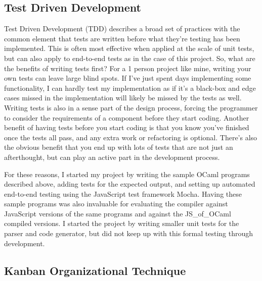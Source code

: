 \documentclass[12pt,a4paper,twoside,openright]{report}
\begin{document}
\subsection{Test Driven Development}
Test Driven Development (TDD) describes a broad set of practices with the common element that tests are written before what they're testing has been implemented.
This is often most effective when applied at the scale of unit tests, but can also apply to end-to-end tests as in the case of this project.
So, what are the benefits of writing tests first?
For a 1 person project like mine, writing your own tests can leave large blind spots.
If I've just spent days implementing some functionality, I can hardly test my implementation as if it's a black-box and edge cases missed in the implementation will likely be missed by the tests as well.
Writing tests is also in a sense part of the design process, forcing the programmer to consider the requirements of a component before they start coding.
Another benefit of having tests before you start coding is that you know you've finished once the tests all pass, and any extra work or refactoring is optional.
There's also the obvious benefit that you end up with lots of tests that are not just an afterthought, but can play an active part in the development process.

For these reasons, I started my project by writing the sample OCaml programs described above, adding tests for the expected output, and setting up automated end-to-end testing using the JavaScript test framework Mocha.
Having these sample programs was also invaluable for evaluating the compiler against JavaScript versions of the same programs and against the JS\_of\_OCaml compiled versions.
I started the project by writing smaller unit tests for the parser and code generator, but did not keep up with this formal testing through development.

\subsection{Kanban Organizational Technique}
\end{document}
